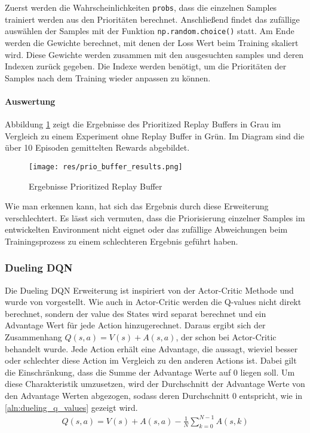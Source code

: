 \documentclass[11pt]{scrartcl}
\begin{document}
\noindent
Zuerst werden die Wahrscheinlichkeiten \lstinline!probs!, dass die einzelnen Samples
trainiert werden aus den Prioritäten berechnet. Anschließend findet das zufällige
auswählen der Samples mit der Funktion \lstinline!np.random.choice()! statt. Am Ende
werden die Gewichte berechnet, mit denen der Loss Wert beim Training skaliert wird. Diese
Gewichte werden zusammen mit den ausgesuchten samples und deren Indexen zurück gegeben.
Die Indexe werden benötigt, um die Prioritäten der Samples nach dem Training wieder
anpassen zu können.

\paragraph*{Auswertung}
Abbildung \ref{fig:prio_buf_results} zeigt die Ergebnisse des Prioritized Replay Buffers
in Grau im Vergleich zu einem Experiment ohne Replay Buffer in Grün. Im Diagram sind die
über 10 Episoden gemittelten Rewards abgebildet.
\begin{figure}[htp]
\centering
\texttt{[image: res/prio\_buffer\_results.png]}
\caption{Ergebnisse Prioritized Replay Buffer}
\label{fig:prio_buf_results}
\end{figure}
\noindent
Wie man erkennen kann, hat sich das Ergebnis durch diese Erweiterung verschlechtert. Es
lässt sich vermuten, dass die Priorisierung einzelner Samples im entwickelten Environment
nicht eignet oder das zufällige Abweichungen beim Trainingsprozess zu einem schlechteren
Ergebnis geführt haben.

\subsubsection{Dueling DQN}

Die Dueling DQN Erweiterung ist inspiriert von der Actor-Critic Methode und wurde von
\cite{wang2015dueling} vorgestellt. Wie auch in Actor-Critic werden die Q-values nicht %
direkt berechnet, sondern der value des States wird separat berechnet und ein Advantage
Wert für jede Action hinzugerechnet. Daraus ergibt sich der Zusammenhang $Q(s, a) = V(s) +
A(s, a)$, der schon bei Actor-Critic behandelt wurde. Jede Action erhält eine Advantage,
die aussagt, wieviel besser oder schlechter diese Action im Vergleich zu den anderen
Actions ist. Dabei gilt die Einschränkung, dass die Summe der Advantage Werte auf
0 liegen soll. Um diese Charakteristik umzusetzen, wird der Durchschnitt der Advantage
Werte von den Advantage Werten abgezogen, sodass deren Durchschnitt 0 entspricht, wie in
\autoref{aln:dueling_q_values} gezeigt wird. %
\begin{align}
  Q(s, a) = V(s) + A(s, a) - \frac{1}{N} \sum_{k=0}^{N-1} A(s, k)
  \label{aln:dueling_q_values}
\end{align}
\end{document}

